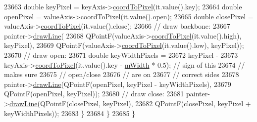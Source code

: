 \begin{DoxyCode}
23663       \textcolor{keywordtype}{double} keyPixel = keyAxis->\hyperlink{class_q_c_p_axis_a985ae693b842fb0422b4390fe36d299a}{coordToPixel}(it.value().key);
23664       \textcolor{keywordtype}{double} openPixel = valueAxis->\hyperlink{class_q_c_p_axis_a985ae693b842fb0422b4390fe36d299a}{coordToPixel}(it.value().open);
23665       \textcolor{keywordtype}{double} closePixel = valueAxis->\hyperlink{class_q_c_p_axis_a985ae693b842fb0422b4390fe36d299a}{coordToPixel}(it.value().close);
23666       \textcolor{comment}{// draw backbone:}
23667       painter->\hyperlink{class_q_c_p_painter_a0b4b1b9bd495e182c731774dc800e6e0}{drawLine}(
23668           QPointF(valueAxis->\hyperlink{class_q_c_p_axis_a985ae693b842fb0422b4390fe36d299a}{coordToPixel}(it.value().high), keyPixel),
23669           QPointF(valueAxis->\hyperlink{class_q_c_p_axis_a985ae693b842fb0422b4390fe36d299a}{coordToPixel}(it.value().low), keyPixel));
23670       \textcolor{comment}{// draw open:}
23671       \textcolor{keywordtype}{double} keyWidthPixels =
23672           keyPixel -
23673           keyAxis->\hyperlink{class_q_c_p_axis_a985ae693b842fb0422b4390fe36d299a}{coordToPixel}(it.value().key - \hyperlink{class_q_c_p_financial_af630e5eb8485146b9c777e63fd1cf993}{mWidth} * 0.5); \textcolor{comment}{// sign of this}
23674                                                                 \textcolor{comment}{// makes sure}
23675                                                                 \textcolor{comment}{// open/close}
23676                                                                 \textcolor{comment}{// are on}
23677                                                                 \textcolor{comment}{// correct sides}
23678       painter->\hyperlink{class_q_c_p_painter_a0b4b1b9bd495e182c731774dc800e6e0}{drawLine}(QPointF(openPixel, keyPixel - keyWidthPixels),
23679                         QPointF(openPixel, keyPixel));
23680       \textcolor{comment}{// draw close:}
23681       painter->\hyperlink{class_q_c_p_painter_a0b4b1b9bd495e182c731774dc800e6e0}{drawLine}(QPointF(closePixel, keyPixel),
23682                         QPointF(closePixel, keyPixel + keyWidthPixels));
23683     \}
23684   \}
23685 \}
\end{DoxyCode}


